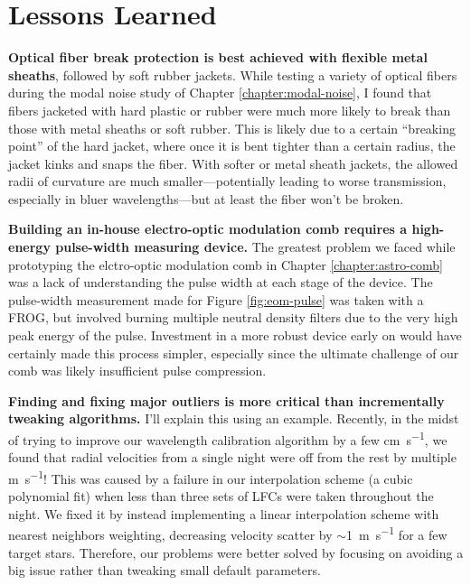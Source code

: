 \section{Lessons Learned} \label{conclusion:lessons}

\textbf{Optical fiber break protection is best achieved with flexible metal sheaths}, followed by soft rubber jackets. While testing a variety of optical fibers during the modal noise study of Chapter \ref{chapter:modal-noise}, I found that fibers jacketed with hard plastic or rubber were much more likely to break than those with metal sheaths or soft rubber. This is likely due to a certain ``breaking point'' of the hard jacket, where once it is bent tighter than a certain radius, the jacket kinks and snaps the fiber. With softer or metal sheath jackets, the allowed radii of curvature are much smaller---potentially leading to worse transmission, especially in bluer wavelengths---but at least the fiber won't be broken.

\textbf{Building an in-house electro-optic modulation comb requires a high-energy pulse-width measuring device.} The greatest problem we faced while prototyping the elctro-optic modulation comb in Chapter \ref{chapter:astro-comb} was a lack of understanding the pulse width at each stage of the device. The pulse-width measurement made for Figure \ref{fig:eom-pulse} was taken with a FROG, but involved burning multiple neutral density filters due to the very high peak energy of the pulse. Investment in a more robust device early on would have certainly made this process simpler, especially since the ultimate challenge of our comb was likely insufficient pulse compression.

\textbf{Finding and fixing major outliers is more critical than incrementally tweaking algorithms.} I'll explain this using an example. Recently, in the midst of trying to improve our wavelength calibration algorithm by a few \si{\centi\meter\per\second}, we found that radial velocities from a single night were off from the rest by multiple \si{\meter\per\second}! This was caused by a failure in our interpolation scheme (a cubic polynomial fit) when less than three sets of LFCs were taken throughout the night. We fixed it by instead implementing a linear interpolation scheme with nearest neighbors weighting, decreasing velocity scatter by $\sim$1~\si{\meter\per\second} for a few target stars. Therefore, our problems were better solved by focusing on avoiding a big issue rather than tweaking small default parameters.

